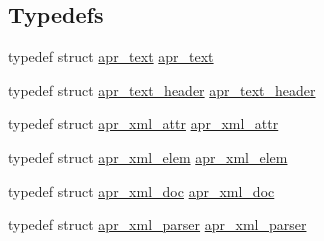 \subsection*{Typedefs}
\begin{DoxyCompactItemize}
\item 
typedef struct \hyperlink{structapr__text}{apr\-\_\-text} \hyperlink{group___a_p_r___util___x_m_l_gafddd251818de0015559bc174f81fd743}{apr\-\_\-text}
\item 
typedef struct \hyperlink{structapr__text__header}{apr\-\_\-text\-\_\-header} \hyperlink{group___a_p_r___util___x_m_l_gaafc6d5ebd59b64a27146cf938a4086e0}{apr\-\_\-text\-\_\-header}
\item 
typedef struct \hyperlink{structapr__xml__attr}{apr\-\_\-xml\-\_\-attr} \hyperlink{group___a_p_r___util___x_m_l_ga4889d4d353f0ea0dabae2d5ae58dd07e}{apr\-\_\-xml\-\_\-attr}
\item 
typedef struct \hyperlink{structapr__xml__elem}{apr\-\_\-xml\-\_\-elem} \hyperlink{group___a_p_r___util___x_m_l_ga31390d11ec04137c925ddf43c2223270}{apr\-\_\-xml\-\_\-elem}
\item 
typedef struct \hyperlink{structapr__xml__doc}{apr\-\_\-xml\-\_\-doc} \hyperlink{group___a_p_r___util___x_m_l_ga98eba70878b9460f2530e7a21bb6ae74}{apr\-\_\-xml\-\_\-doc}
\item 
typedef struct \hyperlink{group___a_p_r___util___x_m_l_gab08a1c255615afda782318811a5053d9}{apr\-\_\-xml\-\_\-parser} \hyperlink{group___a_p_r___util___x_m_l_gab08a1c255615afda782318811a5053d9}{apr\-\_\-xml\-\_\-parser}
\end{DoxyCompactItemize}
